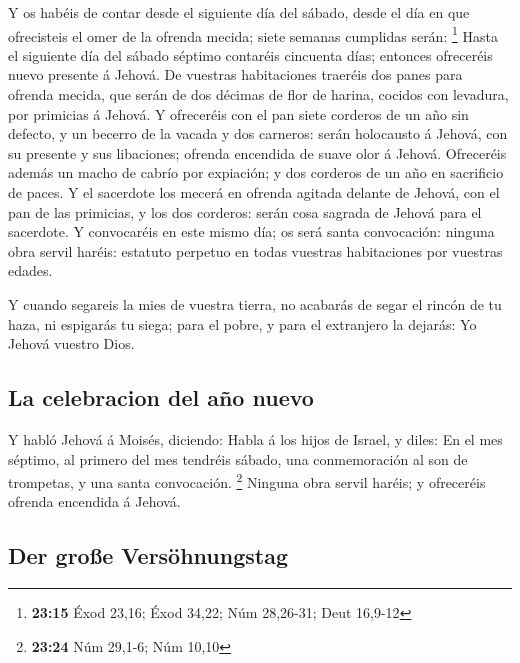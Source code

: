  Y os habéis de contar desde el siguiente día del sábado,
desde el día en que ofrecisteis el omer de la ofrenda mecida; siete
semanas cumplidas serán: \footnote{\textbf{23:15} Éxod 23,16; Éxod
  34,22; Núm 28,26-31; Deut 16,9-12}  Hasta el siguiente
día del sábado séptimo contaréis cincuenta días; entonces ofreceréis
nuevo presente á Jehová.  De vuestras habitaciones
traeréis dos panes para ofrenda mecida, que serán de dos décimas de flor
de harina, cocidos con levadura, por primicias á Jehová. 
Y ofreceréis con el pan siete corderos de un año sin defecto, y un
becerro de la vacada y dos carneros: serán holocausto á Jehová, con su
presente y sus libaciones; ofrenda encendida de suave olor á Jehová.
 Ofreceréis además un macho de cabrío por expiación; y
dos corderos de un año en sacrificio de paces.  Y el
sacerdote los mecerá en ofrenda agitada delante de Jehová, con el pan de
las primicias, y los dos corderos: serán cosa sagrada de Jehová para el
sacerdote.  Y convocaréis en este mismo día; os será
santa convocación: ninguna obra servil haréis: estatuto perpetuo en
todas vuestras habitaciones por vuestras edades.

 Y cuando segareis la mies de vuestra tierra, no acabarás
de segar el rincón de tu haza, ni espigarás tu siega; para el pobre, y
para el extranjero la dejarás: Yo Jehová vuestro Dios.

\hypertarget{la-celebracion-del-auxf1o-nuevo}{%
\subsection{La celebracion del año
nuevo}\label{la-celebracion-del-auxf1o-nuevo}}

 Y habló Jehová á Moisés, diciendo:  Habla
á los hijos de Israel, y diles: En el mes séptimo, al primero del mes
tendréis sábado, una conmemoración al son de trompetas, y una santa
convocación. \footnote{\textbf{23:24} Núm 29,1-6; Núm 10,10}
 Ninguna obra servil haréis; y ofreceréis ofrenda
encendida á Jehová.

\hypertarget{der-grouxdfe-versuxf6hnungstag}{%
\subsection{Der große
Versöhnungstag}\label{der-grouxdfe-versuxf6hnungstag}}

